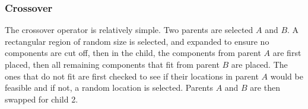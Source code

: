 \documentclass{article}
\begin{document}
\subsubsection{Crossover}
The crossover operator is relatively simple. Two parents are selected $A$ and $B$. A rectangular region of random size is selected, and expanded to ensure no components are cut off, then in the child, the components from parent $A$ are first placed, then all remaining components that fit from parent $B$ are placed. The ones that do not fit are first checked to see if their locations in parent $A$ would be feasible and if not, a random location is selected. Parents $A$ and $B$ are then swapped for child 2.
\begin{figure}[ht]
\centering
{}
\end{figure}
\end{document}
